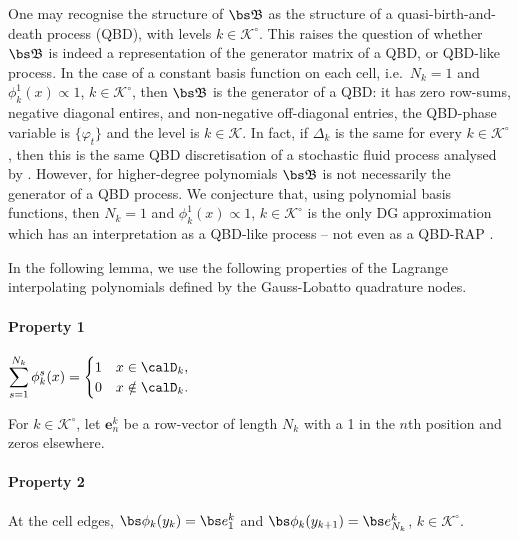 	\begin{rem}
	One may recognise the structure of \( {  {\mathfrak{\bs B}}}\) as the structure of a quasi-birth-and-death process (QBD), with levels \(k\in\mathcal K^\circ\). This raises the question of whether \( {  {\mathfrak{\bs B}}}\) is indeed a representation of the generator matrix of a QBD, or QBD-like process. In the case of a constant basis function on each cell, i.e.~\(N_k=1\) and \(\phi_k^1(x)\propto1\), \(k\in\mathcal K^\circ\), then \( {  {\mathfrak{\bs B}}}\) is the generator of a QBD: it has zero row-sums, negative diagonal entires, and non-negative off-diagonal entries, the QBD-phase variable is \(\{\varphi_t\}\) and the level is \(k\in\mathcal K\). In fact, if \(\Delta_k\) is the same for every \(k\in\mathcal K^\circ\), then this is the same QBD discretisation of a stochastic fluid process analysed by \cite{bo2013}. However, for higher-degree polynomials \(\mathfrak{\bs B}\) is not necessarily the generator of a QBD process. We conjecture that, using polynomial basis functions, then \(N_k=1\) and \(\phi_k^1(x)\propto1\), \(k\in\mathcal K^\circ\) is the only DG approximation which has an interpretation as a QBD-like process -- not even as a QBD-RAP \citep{bn2010}.
	\end{rem}
	
	In the following lemma, we use the following properties of the Lagrange interpolating polynomials defined by the Gauss-Lobatto quadrature nodes. 
	\paragraph{Property 1} \(\displaystyle\sum_{s=1}^{N_k} \phi_k^s(x) = \begin{cases} 1&x\in\calD_k,\\ 0 & x\notin \calD_k.\end{cases}\)

	For \(k\in\mathcal K^\circ\), let \(\boldsymbol e_n^k\) be a row-vector of length \(N_k\) with a 1 in the \(n\)th position and zeros elsewhere.
	\paragraph{Property 2} At the cell edges, \(\bs \phi_k(y_k) = \bs e_1^k\) and \(\bs\phi_k(y_{k+1})=\bs e_{N_k}^k\), \(k\in\mathcal K^\circ\). 

